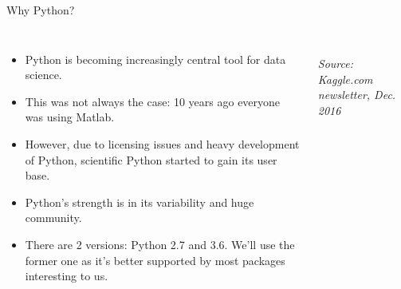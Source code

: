 \documentclass[10pt, aspectratio=169]{beamer} %
\begin{document}
\begin{frame}{Why Python?}
\begin{columns}
\begin{itemize}
\item Python is becoming increasingly central tool for data science.
\item This was not always the case: 10 years ago everyone was using Matlab.
\item However, due to licensing issues and heavy development of Python,
scientific Python started to gain its user base.
\item Python's strength is in its variability and huge community. 
\item There are 2 versions: Python 2.7 and 3.6. We'll use the former one
as it's better supported by most packages interesting to us.
\end{itemize}
\\
\vspace*{0.1cm}
\emph{\tiny Source: Kaggle.com newsletter, Dec. 2016}
\end{columns}
\end{frame}
\end{document}

